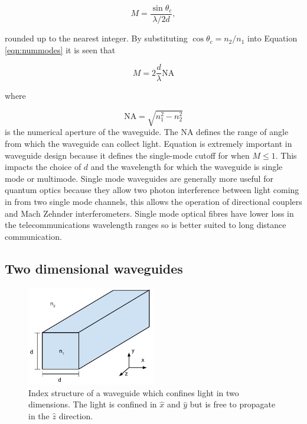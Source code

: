\begin{equation}\label{eqn:nummodes} M = \frac{\sin \theta_c}{ \lambda / 2d},
\end{equation}

rounded up to the nearest integer. By substituting $\cos \theta_c = n_2/n_1$
into Equation \ref{eqn:nummodes} it is seen that

\begin{equation}\label{eqn:nummodes} M = 2\frac{d}{\lambda} \mathrm{NA}
\end{equation}

where

\begin{equation} \mathrm{NA} = \sqrt{n_1^2-n_2^2} \end{equation} is the
numerical aperture of the waveguide. The $\mathrm{NA}$ defines the range of
angle from which the waveguide can collect light. Equation \label{eqn:nummodes}
is extremely important in waveguide design because it defines the single-mode
cutoff for when $M \leq 1$. This impacts the choice of $d$ and the wavelength
for which the waveguide is single mode or multimode. Single mode waveguides are
generally more useful for quantum optics because they allow two photon
interference between light coming in from two single mode channels, this allows
the operation of directional couplers and Mach Zehnder interferometers. Single
mode optical fibres have lower loss in the telecommunications wavelength ranges
so is better suited to long distance communication.

\subsection{Two dimensional waveguides}

\begin{figure}[h!] \begin{center}
\includegraphics[width=0.5\textwidth]{images/2d_waveguide.pdf} \end{center}
\caption{Index structure of a waveguide which confines light in two dimensions.
The light is confined in $\hat{x}$ and $\hat{y}$ but is free to propagate in the
$\hat{z}$ direction.} \label{fig:2dwg} \end{figure}

